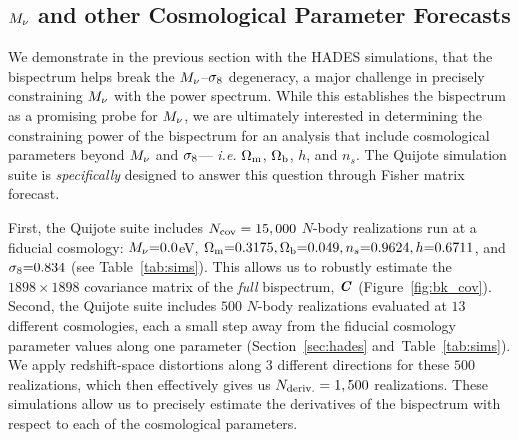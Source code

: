 
\subsection{$M_\nu$ and other Cosmological Parameter Forecasts} \label{sec:forecasts}
We demonstrate in the previous section with the HADES simulations, that 
the bispectrum helps break the $M_\nu$--$\sigma_8$ degeneracy, a major 
challenge in precisely constraining $M_\nu$ with the power spectrum. 
While this establishes the bispectrum as a promising probe for $M_\nu$, 
we are ultimately interested in determining the constraining power of the 
bispectrum for an analysis that include cosmological parameters beyond 
$M_\nu$ and $\sigma_8$--- \emph{i.e.} $\Omega_{\rm m}$, $\Omega_{\rm b}$, $h$, and $n_s$. The Quijote 
simulation suite is \emph{specifically} designed to answer this question
through Fisher matrix forecast.

First, the Quijote suite includes $N_{\rm cov} = 15,000$ $N$-body realizations run at a 
fiducial cosmology: $M_\nu{=}0.0$eV, $\Omega_{\rm m}{=}0.3175, \Omega_{\rm b}{=}0.049, 
n_s{=}0.9624, h{=}0.6711$, and $\sigma_8{=}0.834$ (see Table~\ref{tab:sims}). 
This allows us to robustly estimate the $1898\times1898$ covariance matrix 
of the {\em full} bispectrum, $\textbf{\textit{C}}$ (Figure~\ref{fig:bk_cov}). Second, the Quijote 
suite includes $500$ $N$-body realizations evaluated at $13$ different 
cosmologies, each a small step away from the fiducial cosmology parameter 
values along one parameter (Section~\ref{sec:hades} and~Table~\ref{tab:sims}). 
We apply redshift-space distortions along 3 different directions for 
these $500$ realizations, which then effectively gives us $N_{\rm deriv.} = 1,500$ 
realizations. These simulations allow us to precisely estimate the derivatives 
of the bispectrum with respect to each of the cosmological parameters. 

